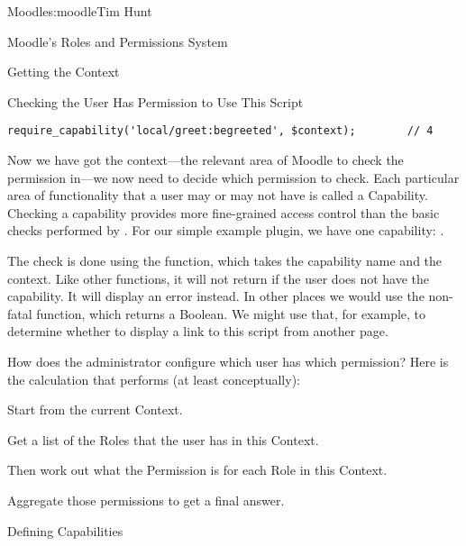 \begin{aosachapter}{Moodle}{s:moodle}{Tim Hunt}
\begin{aosasect1}{Moodle's Roles and Permissions System}
\begin{aosasect2}{Getting the Context}
\end{aosasect2}

\begin{aosasect2}{Checking the User Has Permission to Use This Script}

\begin{verbatim}
require_capability('local/greet:begreeted', $context);        // 4
\end{verbatim}

Now we have got the context---the relevant area of Moodle to check the
permission in---we now need to decide which permission to check. Each
particular area of functionality that a user may or may not have is
called a Capability. Checking a capability provides more fine-grained
access control than the basic checks performed by
. For our simple example plugin, we have one
capability: .

The check is done using the  function, which
takes the capability name and the context. Like other
 functions, it will not return if the user
does not have the capability. It will display an error instead. In
other places we would use the non-fatal 
function, which returns a Boolean. We might use that, for example, to
determine whether to display a link to this script from another page.

How does the administrator configure which user has which permission?
Here is the calculation that  performs (at least
conceptually):

\begin{aosaenumerate}

\item Start from the current Context.

\item Get a list of the Roles that the user has in this Context.

\item Then work out what the Permission is for each Role in this
  Context.

\item Aggregate those permissions to get a final answer.

\end{aosaenumerate}

\end{aosasect2}

\begin{aosasect2}{Defining Capabilities}


\end{aosasect2}
\end{aosasect1}
\end{aosachapter}
